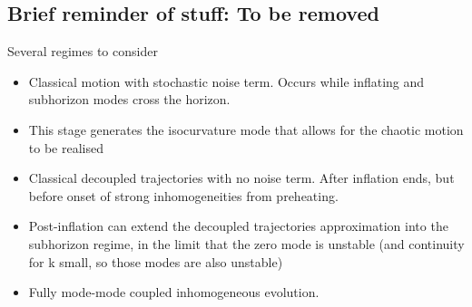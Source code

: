 \subsection{Brief reminder of stuff: To be removed}
Several regimes to consider
\begin{itemize}
\item Classical motion with stochastic noise term.  Occurs while inflating and subhorizon modes cross the horizon.
\item This stage generates the isocurvature mode that allows for the chaotic motion to be realised
\item Classical decoupled trajectories with no noise term.  After inflation ends, but before onset of strong inhomogeneities from preheating.
\item Post-inflation can extend the decoupled trajectories approximation into the subhorizon regime, in the limit that the zero mode is unstable (and continuity for k small, so those modes are also unstable)
\item Fully mode-mode coupled inhomogeneous evolution.

\end{itemize}
